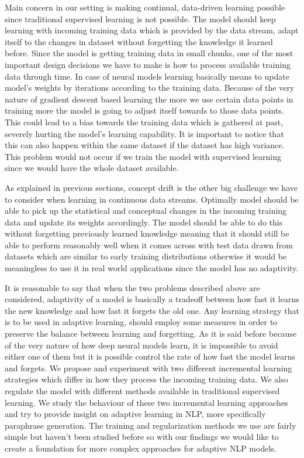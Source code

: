 Main concern in our setting is making continual, data-driven learning possible since traditional supervised learning is not possible. The model should keep learning with incoming training data which is provided by the data stream, adapt itself to the changes in dataset without forgetting the knowledge it learned before. Since the model is getting training data in small chunks, one of the most important design decisions we have to make is how to process available training data through time. In case of neural models learning basically means to update model's weights by iterations according to the training data. Because of the very nature of gradient descent based learning the more we use certain data points in training more the model is going to adjust itself towards to those data points. This could lead to a bias towards the training data which is gathered at past, severely hurting the model's learning capability. It is important to notice that this can also happen within the same dataset if the dataset has high variance. This problem would not occur if we train the model with supervised learning since we would have the whole dataset available.

As explained in previous sections, concept drift is the other big challenge we have to consider when learning in continuous data streams. Optimally model should be able to pick up the statistical and conceptual changes in the incoming training data and update its weights accordingly. The model should be able to do this without forgetting previously learned knowledge meaning that it should still be able to perform reasonably well when it comes across with test data drawn from datasets which are similar to early training distributions otherwise it would be meaningless to use it in real world applications since the model has no adaptivity. 

It is reasonable to say that when the two problems described above are considered, adaptivity of a model is basically a tradeoff between how fast it learns the new knowledge and how fast it forgets the old one. Any learning strategy that is to be used in adaptive learning, should employ some measures in order to preserve the balance between learning and forgetting. As it is said before because of the very nature of how deep neural models learn, it is impossible to avoid either one of them but it is possible control the rate of how fast the model learns and forgets. We propose and experiment with two different incremental learning strategies which differ in how they process the incoming training data. We also regulate the model with different methods available in traditional supervised learning. We study the behaviour of these two incremental learning approaches and try to provide insight on adaptive learning in NLP, more specifically paraphrase generation. The training and regularization methods we use are fairly simple but haven't been studied before so with our findings we would like to create a foundation for more complex approaches for adaptive NLP models.

